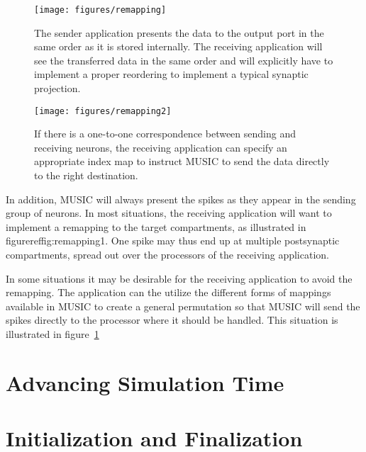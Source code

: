 \documentclass[a4paper]{report}
\begin{document}
\begin{figure}
  \begin{center}
    \begin{minipage}[t]{0.45\textwidth}
      \texttt{[image: figures/remapping]}
      \caption[Processing of incoming data]{\label{fig:remapping1}
        The sender application presents the data to the output port in
        the same order as it is stored internally.  The receiving
        application will see the transferred data in the same order
        and will explicitly have to implement a proper reordering to
        implement a typical synaptic projection.
      }
    \end{minipage}
    \hfill
    \begin{minipage}[t]{0.45\textwidth}
      \texttt{[image: figures/remapping2]}
      \caption[Remapping of data within MUSIC]{\label{fig:remapping2}
        If there is a one-to-one correspondence between sending and
        receiving neurons, the receiving application can specify an
        appropriate index map to instruct MUSIC to send the data
        directly to the right destination.
      }
    \end{minipage}
  \end{center}
\end{figure}

In addition, MUSIC will always present the spikes as they appear in
the sending group of neurons.  In most situations, the receiving
application will want to implement a remapping to the target
compartments, as illustrated in figureref{fig:remapping1}.  One spike
may thus end up at multiple postsynaptic compartments, spread out over
the processors of the receiving application.

In some situations it may be desirable for the receiving application
to avoid the remapping.  The application can the utilize the different
forms of mappings available in MUSIC to create a general permutation
so that MUSIC will send the spikes directly to the processor where it
should be handled.  This situation is illustrated in
figure~\ref{fig:remapping2}


\section{Advancing Simulation Time}


\section{Initialization and Finalization}
\end{document}
